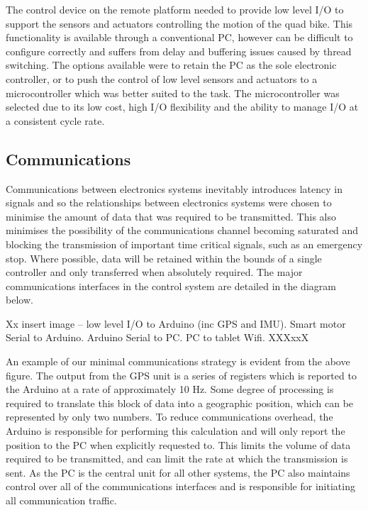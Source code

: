 \documentclass[main.tex]{subfiles}
\begin{document}
The control device on the remote platform needed to provide low level I/O to support the sensors and actuators controlling the motion of the quad bike. This functionality is available through a conventional PC, however can be difficult to configure correctly and suffers from delay and buffering issues caused by thread switching. The options available were to retain the PC as the sole electronic controller, or to push the control of low level sensors and actuators to a microcontroller which was better suited to the task. The microcontroller was selected due to its low cost, high I/O flexibility and the ability to manage I/O at a consistent cycle rate. 


\subsection{Communications}
Communications between electronics systems inevitably introduces latency in signals and so the relationships between electronics systems were chosen to minimise the amount of data that was required to be transmitted. This also minimises the possibility of the communications channel becoming saturated and blocking the transmission of important time critical signals, such as an emergency stop. Where possible, data will be retained within the bounds of a single controller and only transferred when absolutely required. The major communications interfaces in the control system are detailed in the diagram below.

Xx insert image – low level I/O to Arduino (inc GPS and IMU). Smart motor Serial to Arduino. Arduino Serial to PC. PC to tablet Wifi. XXXxxX

An example of our minimal communications strategy is evident from the above figure. The output from the GPS unit is a series of registers which is reported to the Arduino at a rate of approximately 10 Hz. Some degree of processing is required to translate this block of data into a geographic position, which can be represented by only two numbers. To reduce communications overhead, the Arduino is responsible for performing this calculation and will only report the position to the PC when explicitly requested to. This limits the volume of data required to be transmitted, and can limit the rate at which the transmission is sent. As the PC is the central unit for all other systems, the PC also maintains control over all of the communications interfaces and is responsible for initiating all communication traffic.
\end{document}
